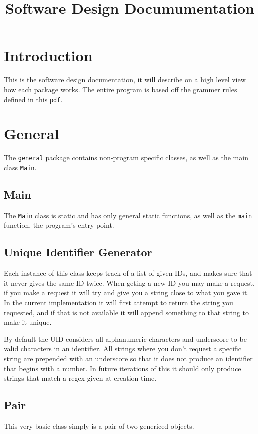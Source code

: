\documentclass{article}
\title{Software Design Documumentation}
\def\grammer{grammer.pdf}
\begin{document}
\maketitle
\tableofcontents
\newpage

\section{Introduction} \label{intro}
This is the software design documentation, it will describe on a high level view how each package works. The entire program is based off the grammer rules defined in \href{\grammer}{this \texttt{pdf}}.

\section{General} \label{general}
The \texttt{general} package contains non-program specific classes, as well as the main class \texttt{Main}.

\subsection{Main}
The \texttt{Main} class is static and has only general static functions, as well as the \texttt{main} function, the program's entry point.

\subsection{Unique Identifier Generator}
Each instance of this class keeps track of a list of given IDs, and makes sure that it never gives the same ID twice. When geting a new ID you may make a request, if you make a request it will try and give you a string close to what you gave it. In the current implementation it will first attempt to return the string you requested, and if that is not available it will append something to that string to make it unique.

By default the UID considers all alphanumeric characters and underscore to be valid characters in an identifier. All strings where you don't request a specific string are prepended with an underscore so that it does not produce an identifier that begins with a number. In future iterations of this it should only produce strings that match a regex given at creation time.

\subsection{Pair}
This very basic class simply is a pair of two genericed objects.
\end{document}

